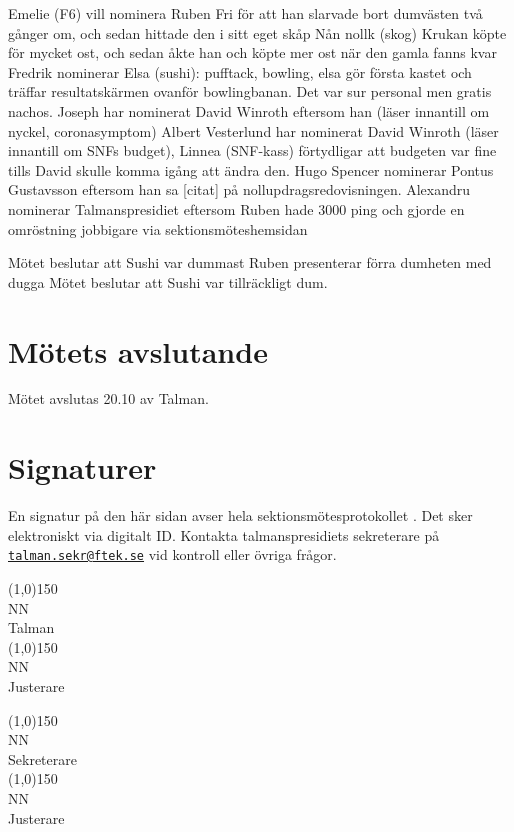 \documentclass{sektionsmote}
\begin{document}
Emelie (F6) vill nominera Ruben Fri för att han slarvade bort dumvästen två gånger om, och sedan hittade den i sitt eget skåp
Nån nollk (skog) Krukan köpte för mycket ost, och sedan åkte han och köpte mer ost när den gamla fanns kvar
Fredrik nominerar Elsa (sushi): pufftack, bowling, elsa gör första kastet och träffar resultatskärmen ovanför bowlingbanan. Det var sur personal men gratis nachos.
Joseph har nominerat David Winroth eftersom han (läser innantill om nyckel, coronasymptom)
Albert Vesterlund har nominerat David Winroth (läser innantill om SNFs budget), Linnea (SNF-kass) förtydligar att budgeten var fine tills David skulle komma igång att ändra den.
Hugo Spencer nominerar Pontus Gustavsson eftersom han sa [citat] på nollupdragsredovisningen.
Alexandru nominerar Talmanspresidiet eftersom Ruben hade 3000 ping och gjorde en omröstning jobbigare via sektionsmöteshemsidan

Mötet beslutar att Sushi var dummast
Ruben presenterar förra dumheten med dugga
Mötet beslutar att Sushi var tillräckligt dum.


\section{Mötets avslutande}
Mötet avslutas 20.10 av Talman.

\clearpage
\section*{Signaturer}
En signatur på den här sidan avser hela sektionsmötesprotokollet \themote. Det sker elektroniskt via digitalt ID. Kontakta talmanspresidiets sekreterare på \href{mailto:talman.sekr@ftek.se}{\texttt{talman.sekr@ftek.se}} vid kontroll eller övriga frågor. 

\vspace{4cm}

\begin{minipage}{0.45\textwidth}
\begin{center}
\line(1,0){150}\\
\footnotesize NN\\ %
Talman\\[3cm]
\line(1,0){150}\\
\footnotesize NN\\ %
Justerare
\end{center}
\end{minipage}
\begin{minipage}{0.45\textwidth}
\begin{center}
\line(1,0){150}\\
\footnotesize NN\\ %
Sekreterare\\[3cm]
\line(1,0){150}\\
\footnotesize NN\\ %
Justerare
\end{center}
\end{minipage}

\clearpage
%
\end{document}
